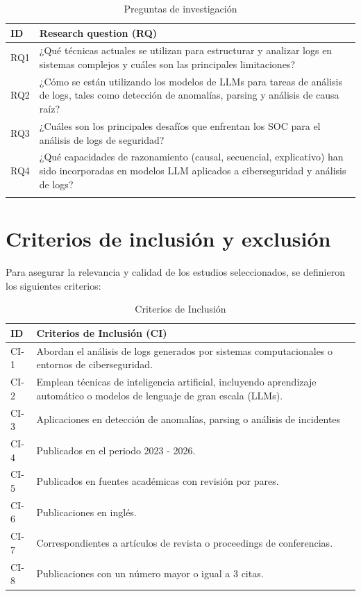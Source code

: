 \begin{table}[H]
\centering
\renewcommand{\arraystretch}{1.2}
\caption{Preguntas de investigación}
\renewcommand{\tablename}{Table}
\setlength{\arrayrulewidth}{1pt}
\begin{tabularx}{0.9\textwidth}{@{} l X @{}}
\toprule
\hline
\textbf{ID} & \textbf{Research question (RQ)} \\
\hline
\midrule
RQ1   & ¿Qué técnicas actuales se utilizan para estructurar y analizar logs en sistemas complejos y cuáles son las principales limitaciones? \\
RQ2   & ¿Cómo se están utilizando los modelos de LLMs para tareas de análisis de logs, tales como detección de anomalías, parsing y análisis de causa raíz? \\
RQ3   & ¿Cuáles son los principales desafíos que enfrentan los SOC para el análisis de logs de seguridad? \\
RQ4 & ¿Qué capacidades de razonamiento (causal, secuencial, explicativo) han sido incorporadas en modelos LLM aplicados a ciberseguridad y análisis de logs? \\
\bottomrule
\hline
\label{RQs}
\end{tabularx}
\end{table}

\section{Criterios de inclusión y exclusión}

Para asegurar la relevancia y calidad de los estudios seleccionados, se definieron los siguientes criterios:

\begin{table}[H]
\centering
\renewcommand{\arraystretch}{1.2}
\caption{Criterios de Inclusión}
\renewcommand{\tablename}{Table}
\setlength{\arrayrulewidth}{1pt}
\begin{tabularx}{0.9\textwidth}{@{} l X @{}}
\toprule
\hline
\textbf{ID} & \textbf{Criterios de Inclusión (CI)} \\
\hline
\midrule
CI-1   & Abordan el análisis de logs generados por sistemas computacionales o entornos de ciberseguridad. \\
CI-2   & Emplean técnicas de inteligencia artificial, incluyendo aprendizaje automático o modelos de lenguaje de gran escala (LLMs). \\
CI-3   & Aplicaciones en detección de anomalías, parsing o análisis de incidentes \\
CI-4   & Publicados en el periodo 2023 - 2026. \\
CI-5   & Publicados en fuentes académicas con revisión por pares.\\
CI-6   & Publicaciones en inglés. \\
CI-7   & Correspondientes a artículos de revista o proceedings de conferencias. \\
CI-8   & Publicaciones con un número mayor o igual a 3 citas. \\
\bottomrule
\hline
\end{tabularx}
\end{table}

